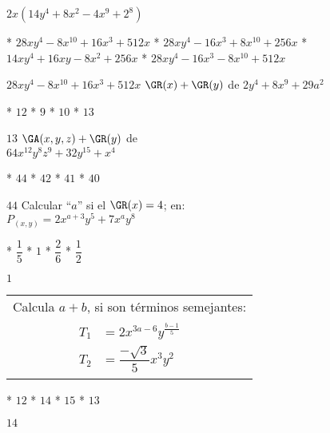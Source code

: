 $2x\left(14y^4+8x^2-4x^9+2^8\right)$
\begin{enum}
  * $28xy^4-8x^{10}+16x^3+512x$
  * $28xy^4-16x^3+8x^{10}+256x$
  * $14xy^4+16xy-8x^2+256x$
  * $28xy^4-16x^3-8x^{10}+512x$
\end{enum}
$28xy^4-8x^{10}+16x^3+512x$
$\GR(x)+\GR(y)$ de $2y^4+8x^9+29a^2$
\begin{enum}
  * $12$
  * $9$
  * $10$
  * $13$
\end{enum}
$13$
$\GA(x,y,z)+\GR(y)$ de \\
$64x^{12}y^8z^9+32y^{15}+x^4$
\begin{enum}
  * $44$
  * $42$
  * $41$
  * $40$
\end{enum}
$44$
Calcular ``$a$'' si el $\GR(x)=4$; en: \\
$P_{(x,y)}=2x^{a+3}y^5+7x^ay^8$
\begin{task}
  * $\dfrac{1}{5}$
  * $1$
  * $\dfrac{2}{6}$
  * $\dfrac{1}{2}$
\end{task}
$1$
\begin{tabular}{c}
  Calcula $a+b$, si son términos semejantes: \\
  $\begin{aligned}
    T_1&=2x^{3a-6}y^{\frac{b-1}{5}} \\
    T_2&=\dfrac{-\sqrt{3}}{5}x^3y^2
  \end{aligned}$
\end{tabular}
\begin{enum}
  * $12$
  * $14$
  * $15$
  * $13$
\end{enum}
$14$
